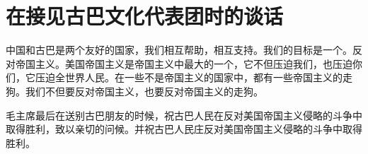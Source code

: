 \section[在接见古巴文化代表团时的谈话（一九六一年四月十九日）]{在接见古巴文化代表团时的谈话}

中国和古巴是两个友好的国家，我们相互帮助，相互支持。我们的目标是一个。反对帝国主义。美国帝国主义是帝国主义中最大的一个，它不但压迫我们，也压迫你们，它压迫全世界人民。在一些不是帝国主义的国家中，都有一些帝国主义的走狗。我们不但要反对帝国主义，也要反对帝国主义的走狗。

毛主席最后在送别古巴朋友的时候，祝古巴人民在反对美国帝国主义侵略的斗争中取得胜利，致以亲切的问候。并祝古巴人民庄反对美国帝国主义侵略的斗争中取得胜利。

